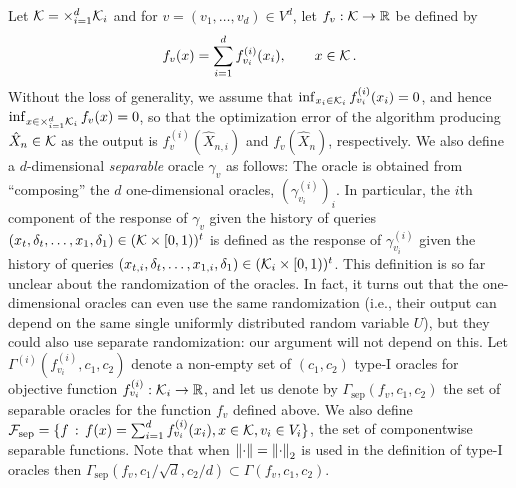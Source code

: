 Let $\mathcal{K} = \times_{i=1}^d \mathcal{K}_i$ and for $v = (v_1,\dots,v_d) \in V^d$, let $f_v: \mathcal{K} \to \mathbb{R}$ be defined by
\begin{align}
f_v(x) = \sum_{i=1}^d f^{(i)}_{v_i}(x_i), \qquad x\in \mathcal{K}\,. \label{eq:sepfdef}
\end{align}
Without the loss of generality, we assume that $\inf_{x_i \in \mathcal{K}_i} f_{v_i}^{(i)}(x_i) = 0$, and hence $\inf_{x\in \times_{i=1}^d \mathcal{K}_i} f_{v}(x) = 0$, so that the optimization error of the algorithm producing $\hat{X}_n \in\mathcal{K}$  as the output is $f_v^{(i)}(\hat{X}_{n,i})$ and $f_v(\hat{X}_{n})$, respectively.
We also define a $d$-dimensional \emph{separable} oracle $\gamma_v$  as follows: 
The oracle  is obtained from ``composing'' the $d$ one-dimensional oracles, $(\gamma_{v_i}^{(i)})_{i}$.
In particular, the $i$th component of the response of $\gamma_v$ 
given the history of queries $(x_{t},\delta_{t},\dots,x_1,\delta_1)\in (\mathcal{K} \times [0,1))^t$
is defined as the response of $\gamma^{(i)}_{v_i}$ 
given the history of queries $(x_{t,i},\delta_{t},\dots,x_{1,i},\delta_1)\in (\mathcal{K}_i\times [0,1))^t$.
This definition is so far unclear about the randomization of the oracles. 
In fact, it turns out that the one-dimensional oracles can even use the same randomization (i.e.,
their output can depend on the same single uniformly distributed random variable $U$), but they could also use separate randomization: our argument will not depend on this.
\newcommand{\sep}{\mathrm{sep}}
Let $\Gamma^{(i)}(f_{v_i}^{(i)},c_1,c_2)$ 
denote a non-empty set of $(c_1,c_2)$ type-I oracles for objective function $f^{(i)}_{v_i}:\mathcal{K}_i \to \mathbb{R}$,
and let us denote by $\Gamma_\sep(f_v,c_1,c_2)$ the set of separable oracles for the function $f_v$ 
defined above.
We also define $\cF_\sep = \{ f\,: \, f(x) = \sum_{i=1}^d f^{(i)}_{v_i}(x_i), x\in \cK, v_i\in V_i \}$, the set of componentwise separable functions.
Note that when $\left\|\cdot\right\| = \left\|\cdot\right\|_2$ is used in the definition of type-I oracles then
$\Gamma_\sep(f_v,c_1/\sqrt{d},c_2/d) \subset \Gamma(f_v,c_1,c_2)$.

